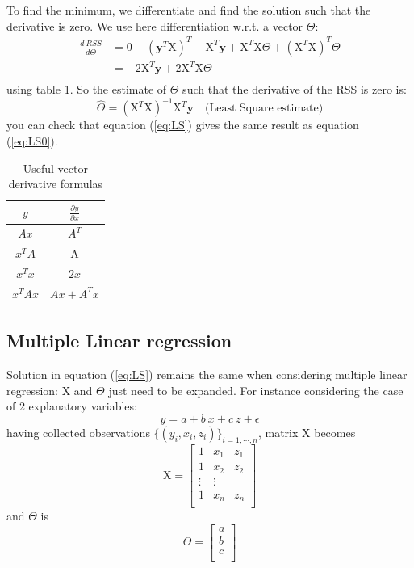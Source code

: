 \documentclass[a4paper,11pt,oneside,onecolumn]{book}
\begin{document}
To find the minimum, we differentiate and find the solution such that the derivative is zero.
We use here differentiation w.r.t. a vector $\Theta$: 
$$
\begin{array}{ll}
\frac{d \ RSS}{d\Theta}&=0-(\mathbf{y}^{T}\mathrm{X})^{T}-\mathrm{X}^{T}\mathbf{y}+\mathrm{X}^{T}\mathrm{X}\Theta+(\mathrm{X}^{T}\mathrm{X})^{T}\Theta\\
&=-2\mathrm{X}^{T}\mathbf{y}+2\mathrm{X}^{T}\mathrm{X}\Theta\\
\end{array}
$$
using table \ref{tab:vector:der}. So the estimate of $\Theta$ such that the derivative of the RSS is zero is:
\begin{equation}
\widehat{\Theta}=(\mathrm{X}^{T}\mathrm{X})^{-1}\mathrm{X}^{T}\mathbf{y} \quad \text{(Least Square estimate)}
\label{eq:LS}
\end{equation}
you can check that equation (\ref{eq:LS}) gives the same result as equation (\ref{eq:LS0}).

\begin{table}[!h]
\begin{center}
\begin{tabular}{c|c}
\hline
$y$ & $\frac{\partial y}{\partial x}$\\
\hline
\hline
$Ax$ & $A^T$\\
$x^TA $& A\\
$x^T x$ & $2x$\\
$x^T Ax$ &$Ax + A^T x$\\
\hline
\end{tabular}
\caption{Useful vector derivative formulas}\label{tab:vector:der}
\end{center}
\end{table}

\subsection{Multiple Linear regression}

Solution in equation (\ref{eq:LS}) remains the same when considering multiple linear regression: $\mathrm{X}$  and $\Theta$ just need to be expanded.
For instance considering the case of 2 explanatory variables:
$$
y=a+b\ x+c\ z+\epsilon
$$
having collected observations $\lbrace (y_i,x_i,z_i)\rbrace_{i=1,\cdots,n}$, matrix $\mathrm{X}$ becomes
$$
\mathrm{X}=
\left\lbrack
\begin{array}{ccc}
1 & x_1 & z_1\\
1&x_2&z_2\\
\vdots & \vdots&\\
1 & x_n& z_n\\
\end{array}\right\rbrack
$$
and $\Theta$ is 
$$
\Theta=
\left\lbrack
\begin{array}{c}
a\\
b\\
c\\
\end{array}\right\rbrack
$$
\end{document}
